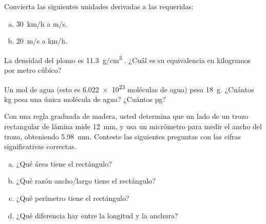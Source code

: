 \documentclass[11pt]{article}
\begin{document}
\begin{exercise}
Convierta las siguientes unidades derivadas a las requeridas:
\begin{enumerate}[a)]
    \item \qty{30}{km/h} a \unit{m/s}.
    \item \qty{20}{m/s} a \unit{km/h}.
\end{enumerate}
\end{exercise}

\begin{exercise}
    La densidad del plomo es \qty{11.3}{g/cm^3} . ¿Cuál es su equivalencia en kilogramos por metro cúbico?
\end{exercise}

\begin{exercise}
    Un mol de agua (esto es \num{6,022e23} moléculas de agua) pesa \qty{18}{g}. ¿Cuántos \unit{kg} pesa una única molécula de agua? ¿Cuántos \unit{\pico g}?
\end{exercise}

\begin{exercise}
    Con una regla graduada de madera, usted determina que un lado de un trozo rectangular de lámina mide \qty{12}{mm}, y usa un micrómetro para medir el ancho del trozo, obteniendo \qty{5.98}{mm}. Conteste las siguientes preguntas con las cifras significativas correctas. 
    \begin{enumerate}[a)]
        \item ¿Qué área tiene el rectángulo? 
        \item ¿Qué razón ancho/largo tiene el rectángulo?
        \item ¿Qué perímetro tiene el rectángulo? 
        \item ¿Qué diferencia hay entre la longitud y la anchura?
    \end{enumerate}
\end{exercise}
\end{document}
